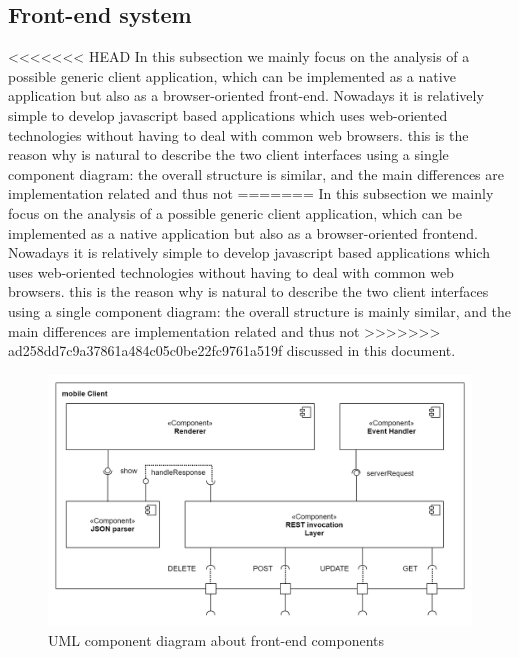\subsection{Front-end system}
<<<<<<< HEAD
In this subsection we mainly focus on the analysis of a possible generic client application, which can be implemented as a native application but also as a browser-oriented front-end.
Nowadays it is relatively simple to develop javascript based applications which uses web-oriented technologies without having to deal with common web browsers. this is the reason why is
natural to describe the two client interfaces using a single component diagram: the overall structure is similar, and the main differences are implementation related and thus not
=======
In this subsection we mainly focus on the analysis of a possible generic client application, which can be implemented as a native application but also as a browser-oriented frontend.
Nowadays it is relatively simple to develop javascript based applications which uses web-oriented technologies without having to deal with common web browsers. this is the reason why is
natural to describe the two client interfaces using a single component diagram: the overall structure is mainly similar, and the main differences are implementation related and thus not
>>>>>>> ad258dd7c9a37861a484c05c0be22fc9761a519f
discussed in this document.
\begin{figure}[H]
    \centering
    \includegraphics[scale=0.2]{Pictures/ComponentDiagram/client_component.png}
    \caption{UML component diagram about front-end components}
    \label{component:client}
\end{figure}

